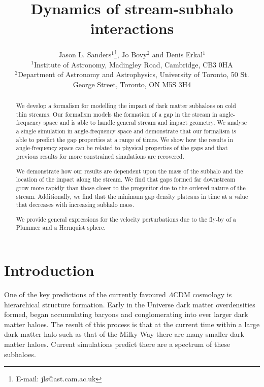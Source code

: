 \documentclass[useAMS,usenatbib,fleqn,a4paper]{mn2e}
\title{Dynamics of stream-subhalo interactions}
\author[J. L. Sanders, J. Bovy and D. Erkal]{Jason L. Sanders$^1$\thanks{E-mail: jls@ast.cam.ac.uk}, Jo Bovy$^2$ and Denis Erkal$^1$\\
$^1$Institute of Astronomy, Madingley Road, Cambridge, CB3 0HA\\
$^2$Department of Astronomy and Astrophysics, University of Toronto, 50 St. George Street, Toronto, ON M5S 3H4}
\begin{document}
\maketitle
\label{firstpage}
\begin{abstract}
We develop a formalism for modelling the impact of dark matter subhaloes on cold thin streams. Our formalism models the formation of a gap in the stream in angle-frequency space and is able to handle general stream and impact geometry. We analyse a single simulation in angle-frequency space and demonstrate that our formalism is able to predict the gap properties at a range of times. We show how the results in angle-frequency space can be related to physical properties of the gaps and that previous results for more constrained simulations are recovered.

We demonstrate how our results are dependent upon the mass of the subhalo and the location of the impact along the stream. We find that gaps formed far downstream grow more rapidly than those closer to the progenitor due to the ordered nature of the stream. Additionally, we find that the minimum gap density plateaus in time at a value that decreases with increasing subhalo mass.

We provide general expressions for the velocity perturbations due to the fly-by of a Plummer and a Hernquist sphere.
\end{abstract}

\begin{keywords}
\end{keywords}

\section{Introduction}

One of the key predictions of the currently favoured $\Lambda$CDM cosmology is hierarchical structure formation. Early in the Universe dark matter overdensities formed, began accumulating baryons and conglomerating into ever larger dark matter haloes. The result of this process is that at the current time within a large dark matter halo such as that of the Milky Way there are many smaller dark matter haloes. Current simulations \citep{Diemand2008,Springel2008} predict there are a spectrum of these subhaloes.
\end{document}
